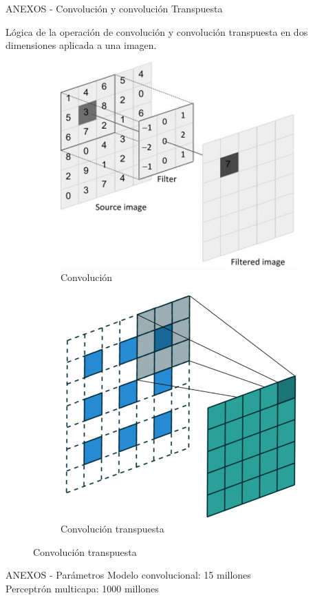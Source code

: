 \documentclass[12pt,aspectratio=169]{beamer}
\begin{document}
\begin{frame}{ANEXOS -  Convolución y convolución Transpuesta}

    Lógica de la operación de convolución y convolución transpuesta en dos dimensiones aplicada a una imagen.

    \begin{figure}
        \begin{subfigure}{0.45\textwidth}
            \centering
            \includegraphics[scale=0.325]{figs/conv_2d.jpg}
            \caption{Convolución}
        \end{subfigure}
        \begin{subfigure}{0.45\textwidth}
            \centering
            \includegraphics[scale=0.30]{figs/trans_conv.PNG}
            \caption{Convolución transpuesta}
        \end{subfigure}
    \end{figure}

\end{frame}

\begin{frame}{ANEXOS - Parámetros}
    Modelo convolucional: 15 millones\\
    Perceptrón multicapa: 1000 millones
\end{frame}
\end{document}
